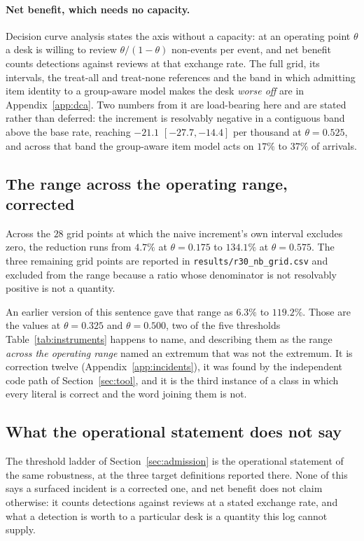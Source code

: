\documentclass[preprint,12pt]{elsarticle}
\begin{document}
\paragraph{Net benefit, which needs no capacity.}
Decision curve analysis states the axis without a capacity: at an operating
point $\theta$ a desk is willing to review $\theta/(1-\theta)$ non-events per
event, and net benefit counts detections against reviews at that exchange
rate. The full grid, its intervals, the treat-all and treat-none references
and the band in which admitting item identity to a group-aware model makes
the desk \emph{worse off} are in Appendix~\ref{app:dca}. Two numbers from it
are load-bearing here and are stated rather than deferred: the increment is
resolvably negative in a contiguous band above the base rate, reaching
$-21.1$ $[-27.7,-14.4]$ per thousand at $\theta = 0.525$, and across that band
the group-aware item model acts on $17\%$ to $37\%$ of arrivals.

\subsection{The range across the operating range, corrected}
\label{sec:opp:range}

Across the $28$ grid points at which the naive increment's own interval
excludes zero, the reduction runs from $4.7\%$ at $\theta = 0.175$ to
$134.1\%$ at $\theta = 0.575$. The three remaining grid points are reported
in \texttt{results/r30\_nb\_grid.csv} and excluded from the range because a
ratio whose denominator is not resolvably positive is not a quantity.

An earlier version of this sentence gave that range as $6.3\%$ to $119.2\%$.
Those are the values at $\theta = 0.325$ and $\theta = 0.500$, two of the
five thresholds Table~\ref{tab:instruments} happens to name, and describing
them as the range \emph{across the operating range} named an extremum that
was not the extremum. It is correction twelve
(Appendix~\ref{app:incidents}), it was found by the independent code path of
Section~\ref{sec:tool}, and it is the third instance of a class in which
every literal is correct and the word joining them is not.

\subsection{What the operational statement does not say}

The threshold ladder of Section~\ref{sec:admission} is the operational
statement of the same robustness, at the three target definitions reported
there. None of this says a surfaced incident is a corrected one, and net
benefit does not claim otherwise: it
counts detections against reviews at a stated exchange rate, and what a
detection is worth to a particular desk is a quantity this log cannot supply.
\end{document}
